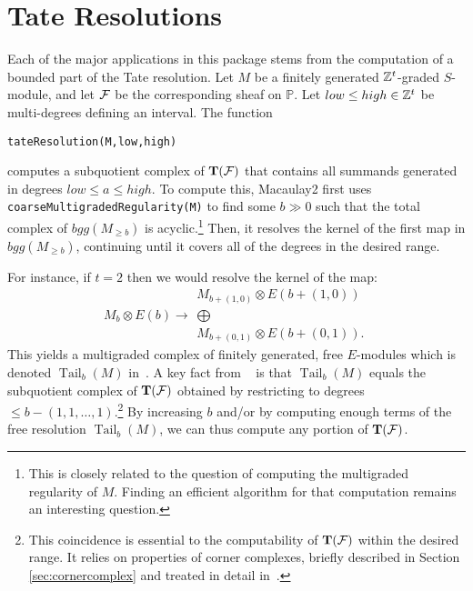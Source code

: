 \documentclass[twoside,12pt, leqno]{amsart}
\def\PP{{\mathbb P}}
\def\bT{{\bf T}}
\begin{document}
\section{Tate Resolutions}\label{sec:tate resolutions}
Each of the major applications in this package stems from the computation of a bounded part of the Tate resolution.
Let $M$ be a finitely generated ${\mathbb Z}^t$-graded $S$-module, and let ${\mathcal F}$ be the 
corresponding sheaf on $\PP$. Let
$low\leq high\in {\mathbb Z}^t$ be multi-degrees defining an interval.  The function
\begin{verbatim}
tateResolution(M,low,high)
\end{verbatim}
computes a subquotient complex of $\bT(\sF)$ that contains all summands generated in degrees $low\leq a \leq  high$.  To compute this, Macaulay2 first uses  {\tt coarseMultigradedRegularity(M)} to find some $b\gg 0$ such that the total complex of $bgg(M_{\geq b})$ is acyclic.\footnote{This is closely related to the question of computing the multigraded regularity of $M$. Finding an efficient algorithm for that computation remains an interesting question.}  Then, it resolves the kernel of  the first map in $bgg(M_{\geq b})$, continuing until it covers all of the degrees in the desired range.  

For instance, if $t=2$ then we would resolve the kernel of the map:
\[
M_b \otimes E(b) \to 
\begin{matrix}
M_{b+(1,0)} \otimes E(b+(1,0))\\
\bigoplus
\\
M_{b+(0,1)} \otimes E(b+(0,1)).
\end{matrix}
\]
This yields a multigraded complex of finitely generated, free $E$-modules which is denoted $\operatorname{Tail}_b(M)$ in~\cite[\S1]{EES}.  A key fact from ~\cite[\S1]{EES} is that $\operatorname{Tail}_b(M)$ equals the subquotient complex of $\bT(\sF)$ obtained by restricting to degrees $\leq b - (1,1,\dots,1)$.\footnote{This coincidence is essential to the computability of $\bT(\sF)$ within the desired range.  It relies on properties of corner complexes, briefly described in Section \ref{sec:cornercomplex} and treated in detail in~\cite[\S3]{EES}.}
 By increasing $b$ and/or by computing enough terms of the free resolution $\operatorname{Tail}_b(M)$, we can thus compute any portion of $\bT(\sF)$.  
\end{document}
